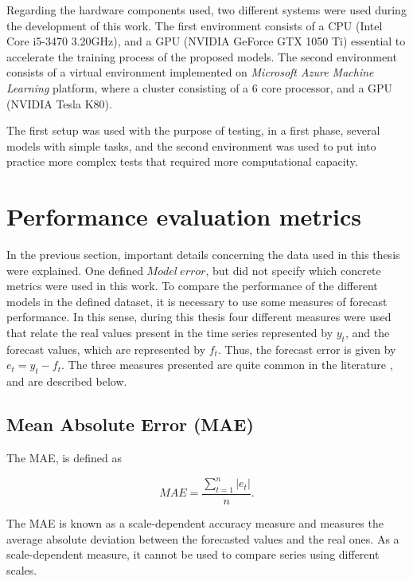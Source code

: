 Regarding the hardware components used, two different systems were used during the development of this work. The first environment consists of a CPU (Intel Core i5-3470 3.20GHz), and a GPU (NVIDIA GeForce GTX 1050 Ti) essential to accelerate the training process of the proposed models. The second environment consists of a virtual environment implemented on \textit{Microsoft Azure Machine Learning} platform, where a cluster consisting of a 6 core processor, and a GPU (NVIDIA Tesla K80).

The first setup was used with the purpose of testing, in a first phase, several models with simple tasks, and the second environment was used to put into practice more complex tests that required more computational capacity.
	
\section{Performance evaluation metrics}\label{chap3:sec:performance_evaluation_metrics}

In the previous section, important details concerning the data used in this thesis were explained. One defined $Model\ error$, but did not specify which concrete metrics were used in this work. To compare the performance of the different models in the defined dataset, it is necessary to use some measures of forecast performance. In this sense, during this thesis four different measures were used that relate the real values present in the time series represented by $y_t$, and the forecast values, which are represented by $f_t$. Thus, the forecast error is given by $e_t=y_t-f_t$. The three measures presented are quite common in the literature \cite{errors}, and are described below.

\subsection{Mean Absolute Error (MAE)}

The \ac{MAE}, is defined as

\begin{equation}
     MAE =\frac {\sum_{t=1}^n|e_t|}{n}.
\label{mae}
\end{equation}

The \ac{MAE} is known as a scale-dependent accuracy measure and measures the average absolute deviation between the forecasted values and the real ones. As a scale-dependent measure, it cannot be used to compare series using different scales.



